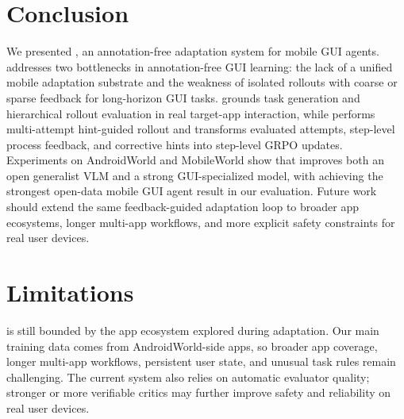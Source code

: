 \section{Conclusion}

We presented \ourmethod, an annotation-free adaptation system for mobile GUI agents. \ourmethod addresses two bottlenecks in annotation-free GUI learning: the lack of a unified mobile adaptation substrate and the weakness of isolated rollouts with coarse or sparse feedback for long-horizon GUI tasks. \mobilegym grounds task generation and hierarchical rollout evaluation in real target-app interaction, while \hifpo performs multi-attempt hint-guided rollout and transforms evaluated attempts, step-level process feedback, and corrective hints into step-level GRPO updates. Experiments on AndroidWorld and MobileWorld show that \ourmethod improves both an open generalist VLM and a strong GUI-specialized model, with  achieving the strongest open-data mobile GUI agent result in our evaluation. Future work should extend the same feedback-guided adaptation loop to broader app ecosystems, longer multi-app workflows, and more explicit safety constraints for real user devices.

\section{Limitations}

\ourmethod is still bounded by the app ecosystem explored during adaptation. Our main training data comes from AndroidWorld-side apps, so broader app coverage, longer multi-app workflows, persistent user state, and unusual task rules remain challenging. The current system also relies on automatic evaluator quality; stronger or more verifiable critics may further improve safety and reliability on real user devices.
